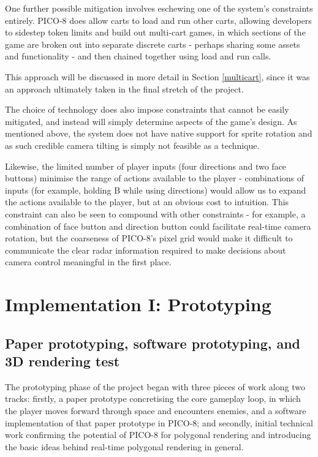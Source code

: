 \documentclass[11pt]{article}
\begin{document}

One further possible mitigation involves eschewing one of the system's constraints entirely.
PICO-8 does allow carts to load and run other carts, allowing developers to sidestep token
limits and build out multi-cart games, in which sections of the game are broken out into
separate discrete carts - perhaps sharing some assets and functionality - and then chained
together using load and run calls.

This approach will be discussed in more detail in Section \ref{multicart}, since it was an
approach ultimately taken in the final stretch of the project.


The choice of technology does also impose constraints that cannot be easily mitigated, and
instead will simply determine aspects of the game's design. As mentioned above, the system
does not have native support for sprite rotation and as such credible camera tilting is simply
not feasible as a technique.

Likewise, the limited number of player inputs (four directions and
two face buttons) minimise the range of actions available to the player - combinations of inputs
(for example, holding B while using directions) would allow us to expand the actions available
to the player, but at an obvious cost to intuition. This constraint can also be seen to
compound with other constraints - for example, a combination of face button and direction
button could facilitate real-time camera rotation, but the coarseness of PICO-8's pixel
grid would make it difficult to communicate the clear radar information required to
make decisions about camera control meaningful in the first place.

\section{Implementation I: Prototyping}

\subsection{Paper prototyping, software prototyping, and 3D rendering test}\label{prototyping}
The prototyping phase of the project began with three pieces of work along two tracks: firstly,
a paper prototype concretising the core gameplay loop, in which the player moves forward through
space and encounters enemies, and a software implementation of that paper prototype in PICO-8; and
secondly, initial technical work confirming the potential of PICO-8 for polygonal rendering and
introducing the basic ideas behind real-time polygonal rendering in general.
\end{document}
